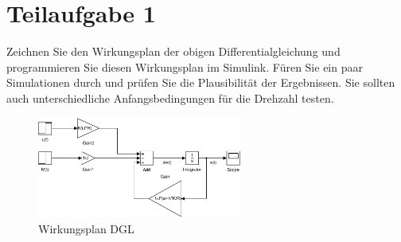 \section{Teilaufgabe 1}
\begin{aufgabe}
    Zeichnen Sie den Wirkungsplan der obigen Differentialgleichung und 
    programmieren Sie diesen Wirkungsplan im Simulink. Füren Sie ein paar 
    Simulationen durch und prüfen Sie die Plausibilität der Ergebnissen. Sie 
    sollten auch unterschiedliche Anfangsbedingungen für die Drehzahl testen.
\end{aufgabe}
\begin{figure}[h!]
    \centering
    \includegraphics[width=0.6\textwidth]{01/wirkungsplan.pdf}
    \caption{Wirkungsplan DGL}
    \label{fig:01}
\end{figure}
